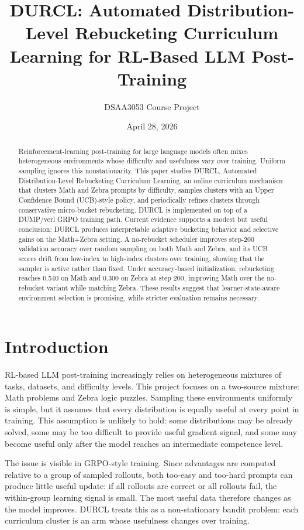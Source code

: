 \documentclass[10pt]{article}
\title{DURCL: Automated Distribution-Level Rebucketing Curriculum Learning for RL-Based LLM Post-Training}
\author{DSAA3053 Course Project}
\date{April 28, 2026}
\begin{document}
\maketitle

\begin{abstract}
Reinforcement-learning post-training for large language models often mixes heterogeneous environments whose difficulty and usefulness vary over training. Uniform sampling ignores this nonstationarity. This paper studies DURCL, Automated Distribution-Level Rebucketing Curriculum Learning, an online curriculum mechanism that clusters Math and Zebra prompts by difficulty, samples clusters with an Upper Confidence Bound (UCB)-style policy, and periodically refines clusters through conservative micro-bucket rebucketing. DURCL is implemented on top of a DUMP/verl GRPO training path. Current evidence supports a modest but useful conclusion: DURCL produces interpretable adaptive bucketing behavior and selective gains on the Math+Zebra setting. A no-rebucket scheduler improves step-200 validation accuracy over random sampling on both Math and Zebra, and its UCB scores drift from low-index to high-index clusters over training, showing that the sampler is active rather than fixed. Under accuracy-based initialization, rebucketing reaches 0.540 on Math and 0.300 on Zebra at step 200, improving Math over the no-rebucket variant while matching Zebra. These results suggest that learner-state-aware environment selection is promising, while stricter evaluation remains necessary.
\end{abstract}

\section{Introduction}

RL-based LLM post-training increasingly relies on heterogeneous mixtures of tasks, datasets, and difficulty levels. This project focuses on a two-source mixture: Math problems and Zebra logic puzzles. Sampling these environments uniformly is simple, but it assumes that every distribution is equally useful at every point in training. This assumption is unlikely to hold: some distributions may be already solved, some may be too difficult to provide useful gradient signal, and some may become useful only after the model reaches an intermediate competence level.

The issue is visible in GRPO-style training. Since advantages are computed relative to a group of sampled rollouts, both too-easy and too-hard prompts can produce little useful update: if all rollouts are correct or all rollouts fail, the within-group learning signal is small. The most useful data therefore changes as the model improves. DURCL treats this as a non-stationary bandit problem: each curriculum cluster is an arm whose usefulness changes over training.
\end{document}

